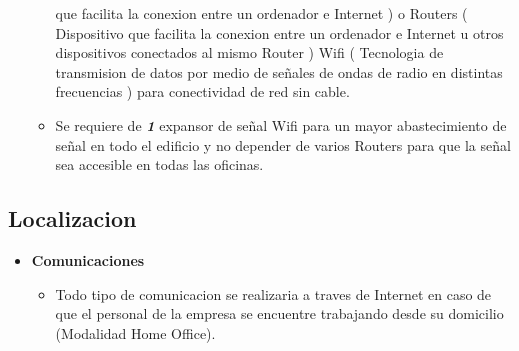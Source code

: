 \documentclass[
10pt, %
a4paper, %
oneside, %
headinclude,footinclude, %
BCOR5mm, %
]{scrartcl}
\begin{document}
\begin{itemize}
\begin{itemize}
            que facilita la conexion entre un ordenador e Internet ) o
            Routers ( Dispositivo que facilita la conexion entre un
            ordenador e Internet u otros dispositivos conectados al mismo
            Router ) Wifi ( Tecnologia de transmision de datos por medio de
            señales de ondas de radio en distintas frecuencias ) para
            conectividad de red sin cable.
\pagebreak
    \item Se requiere de \emph { \textbf{1} } expansor de señal Wifi
            para un mayor abastecimiento de señal en todo el edificio y
            no depender de varios Routers para que la señal sea accesible en
            todas las oficinas.
  \end{itemize}
\end{itemize}

\subsection{Localizacion}
\begin{itemize}
  \item \textbf {Comunicaciones}
  \begin{itemize}
    \item Todo tipo de comunicacion se realizaria a traves de Internet en caso
            de que el personal de la empresa se encuentre trabajando desde su
            domicilio (Modalidad Home Office).
  \end{itemize}
\end{itemize}
\end{document}
